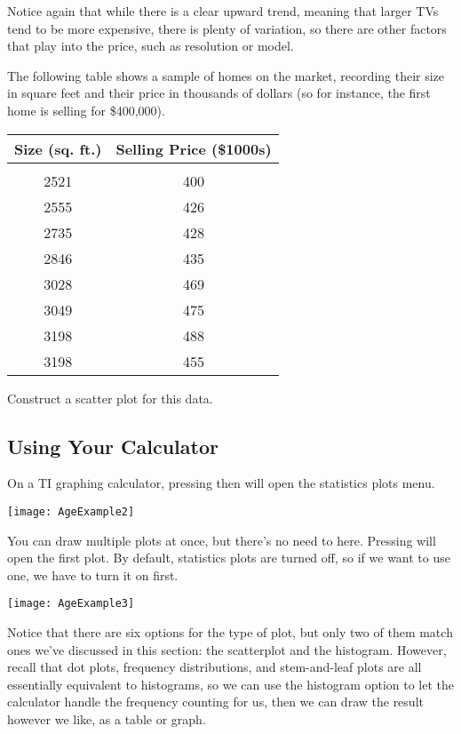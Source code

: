 Notice again that while there is a clear upward trend, meaning that larger TVs tend to be more expensive, there is plenty of variation, so there are other factors that play into the price, such as resolution or model.

\begin{try}
The following table shows a sample of homes on the market, recording their size in square feet and their price in thousands of dollars (so for instance, the first home is selling for \$400,000).
\begin{center}
\begin{tabular}{c | c}
Size (sq. ft.) & Selling Price (\$1000s)\\
\hline
\\
2521 & 400\\
2555 & 426\\
2735 & 428\\
2846 & 435\\
3028 & 469\\
3049 & 475\\
3198 & 488\\
3198 & 455\\
\end{tabular}
\end{center}

Construct a scatter plot for this data.
\end{try}
\vfill
\pagebreak

\subsection{Using Your Calculator}
On a TI graphing calculator, pressing  then  will open the statistics plots menu.
\begin{center}
\texttt{[image: AgeExample2]}
\end{center}

You can draw multiple plots at once, but there's no need to here.  Pressing  will open the first plot.  By default, statistics plots are turned off, so if we want to use one, we have to turn it on first.
\begin{center}
\texttt{[image: AgeExample3]}
\end{center}

Notice that there are six options for the type of plot, but only two of them match ones we've discussed in this section: the scatterplot and the histogram.  However, recall that dot plots, frequency distributions, and stem-and-leaf plots are all essentially equivalent to histograms, so we can use the histogram option to let the calculator handle the frequency counting for us, then we can draw the result however we like, as a table or graph.

